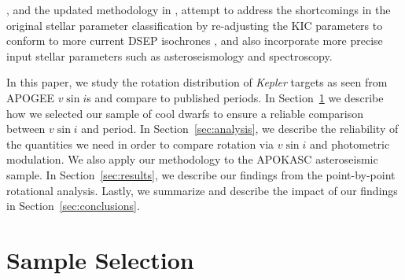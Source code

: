 \documentclass[manuscript]{aastex6}
\newcommand{\vsini}{\ensuremath{v \sin i}}
\newcommand{\Kepler}{\mbox{\textit{Kepler}}}
\begin{document}
\citet{Huber14}, and the updated methodology in \citet{Mathur17}, attempt to
address the shortcomings in the original stellar parameter classification by
re-adjusting the KIC parameters to conform to more current DSEP isochrones 
\citep{Dotter08}, and also incorporate more precise input stellar parameters 
such as asteroseismology and spectroscopy. 

In this paper, we study the rotation distribution of \Kepler{} targets as
seen from APOGEE \vsini{}s and compare to published periods. In 
Section~\ref{sec:sample} we describe how we
selected our sample of cool dwarfs to ensure a reliable comparison between
\vsini{} and period. In Section~\ref{sec:analysis}, we describe the reliability
of the quantities we need in order to compare rotation via \vsini{} and
photometric modulation. We also apply our methodology to the APOKASC
asteroseismic sample. In Section~\ref{sec:results}, we describe our findings
from the point-by-point rotational analysis. Lastly, we summarize and describe
the impact of our findings in Section~\ref{sec:conclusions}.

\section{Sample Selection}
\label{sec:sample}
\end{document}
